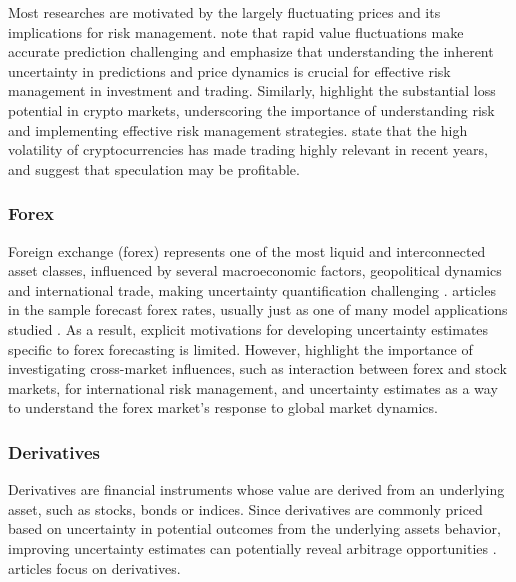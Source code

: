 Most researches are motivated by the largely fluctuating prices and its implications for risk management. \textcite{Golnari2024Cryptocurrency} note that rapid value fluctuations make accurate prediction challenging and emphasize that understanding the inherent uncertainty in predictions and price dynamics is crucial for effective risk management in investment and trading. Similarly, 
\textcite{Almeida2024RiskForecasting} highlight the substantial loss potential in crypto markets, underscoring the importance of understanding risk and implementing effective risk management strategies. \textcite{cocco2021predictions} state that the high volatility of cryptocurrencies has made trading highly relevant in recent years, and suggest that speculation may be profitable. 


\subsubsection{Forex}
Foreign exchange (forex) represents one of the most liquid and interconnected asset classes, influenced by several macroeconomic factors, geopolitical dynamics and international trade, making uncertainty quantification challenging \parencite{Rossi2013ExchangeRP}. \forexarticles articles in the sample forecast forex rates, usually just as one of many model applications studied \parencite{park2011trend, Platanios2014gpr, tang2024period, li2010stochastic, Papaioannou2022gpr}. As a result, explicit motivations for developing uncertainty estimates specific to forex forecasting is limited. However, \textcite{cao2019multi} highlight the importance of investigating cross-market influences, such as interaction between forex and stock markets, for international risk management, and uncertainty estimates as a way to understand the forex market's response to global market dynamics.

\subsubsection{Derivatives}
Derivatives are financial instruments whose value are derived from an underlying asset, such as stocks, bonds or indices. Since derivatives are commonly priced based on uncertainty in potential outcomes from the underlying assets behavior, improving uncertainty estimates can potentially reveal arbitrage opportunities \parencite{black_scholes_1973}. \derivativesarticles articles focus on derivatives. 

